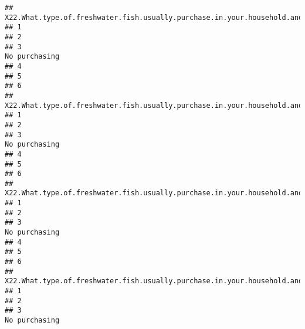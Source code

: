 \documentclass[
]{article}
\begin{document}
\begin{verbatim}
##   X22.What.type.of.freshwater.fish.usually.purchase.in.your.household.and.how.much.per.month...Kawayya.
## 1                                                                                                      
## 2                                                                                                      
## 3                                                                                         No purchasing
## 4                                                                                                      
## 5                                                                                                      
## 6                                                                                                      
##   X22.What.type.of.freshwater.fish.usually.purchase.in.your.household.and.how.much.per.month...Ankutta.
## 1                                                                                                      
## 2                                                                                                      
## 3                                                                                         No purchasing
## 4                                                                                                      
## 5                                                                                                      
## 6                                                                                                      
##   X22.What.type.of.freshwater.fish.usually.purchase.in.your.household.and.how.much.per.month...Magura.
## 1                                                                                                     
## 2                                                                                                     
## 3                                                                                        No purchasing
## 4                                                                                                     
## 5                                                                                                     
## 6                                                                                                     
##   X22.What.type.of.freshwater.fish.usually.purchase.in.your.household.and.how.much.per.month...Karadu.issa.
## 1                                                                                                          
## 2                                                                                                          
## 3                                                                                             No purchasing

\end{verbatim}
\end{document}
